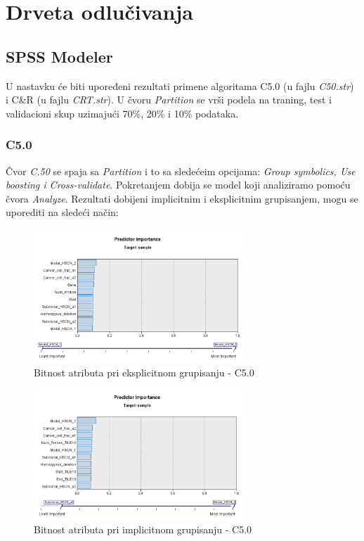 \documentclass[a4paper]{article}
\begin{document}
\section{Drveta odlučivanja}
\label{sec:drveta}

\subsection{SPSS Modeler}

U nastavku će biti upoređeni rezultati primene algoritama C5.0 (u fajlu \textit{C50.str}) i C\&R (u fajlu \textit{CRT.str}). U čvoru \textit{Partition} se vrši podela na traning, test i validacioni skup uzimajući 70\%, 20\% i 10\% podataka.

\subsubsection{C5.0}
\label{subsubsec:c50}

Čvor \textit{C.50} se spaja sa \textit{Partition} i to sa sledećeim opcijama: \textit{Group symbolics, Use boosting i Cross-validate}. Pokretanjem dobija se model koji analiziramo pomoću čvora \textit{Analyze}. Rezultati dobijeni implicitnim i eksplicitnim grupisanjem, mogu se uporediti na sledeći način:

            \begin{figure}[ht]
                \centering
                \includegraphics[width=0.7\textwidth]{C50_model_explicit.PNG}
                \caption{Bitnost atributa pri eksplicitnom grupisanju - C5.0}
                \label{fig:c50_predictor_ex}
            \end{figure}
            
            \begin{figure}[ht]
                \centering
                \includegraphics[width=0.7\textwidth]{C50_model_implicit.PNG}
                \caption{Bitnost atributa pri implicitnom grupisanju - C5.0}
                \label{fig:c50_predictor_im}
            \end{figure}
\end{document}
